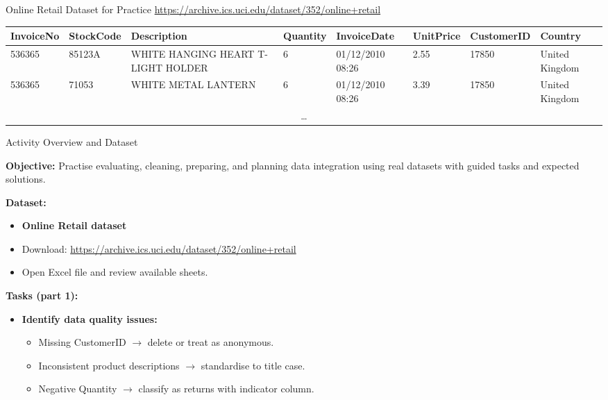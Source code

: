 \documentclass[aspectratio=169, table]{beamer}
\begin{document}
\begin{frame}{Online Retail Dataset for Practice}
	\vspace{10pt}
	\url{https://archive.ics.uci.edu/dataset/352/online+retail}
	
	\vspace{10pt}

	\renewcommand{\arraystretch}{1.2}
	\setlength{\arrayrulewidth}{0.3mm} %
	\centering
		\scriptsize
	\begin{tabular}{|p{}|p{}|p{}|p{}|p{}|p{}|p{}|p{}|}
		\hline
		\textbf{InvoiceNo} & \textbf{StockCode} & \textbf{Description} & \textbf{Quantity} & \textbf{InvoiceDate} & \textbf{UnitPrice} & \textbf{CustomerID} & \textbf{Country} \\
		\hline
		536365 & 85123A & WHITE HANGING HEART T-LIGHT HOLDER & 6 & 01/12/2010 08:26 & 2.55 & 17850 & United Kingdom \\
		\hline
		536365 & 71053 & WHITE METAL LANTERN & 6 & 01/12/2010 08:26 & 3.39 & 17850 & United Kingdom \\
		\hline
		\multicolumn{8}{c}{\ldots} \\
		\hline
	\end{tabular}
\end{frame}


\begin{frame}{Activity Overview and Dataset}
	\vspace{20pt}
	
	\textbf{Objective:} Practise evaluating, cleaning, preparing, and planning data integration using real datasets with guided tasks and expected solutions.
	
	\textbf{Dataset:}
	\begin{itemize}
		\item \textbf{Online Retail dataset}
		\item Download: \url{https://archive.ics.uci.edu/dataset/352/online+retail}
		\item Open Excel file and review available sheets.
	\end{itemize}
	
	\textbf{Tasks (part 1):}
	\begin{itemize}
		\item \textbf{Identify data quality issues:}
		\begin{itemize}
			\item Missing CustomerID $\rightarrow$ delete or treat as anonymous.
			\item Inconsistent product descriptions $\rightarrow$ standardise to title case.
			\item Negative Quantity $\rightarrow$ classify as returns with indicator column.
		\end{itemize}
	\end{itemize}
	
\end{frame}
\end{document}
